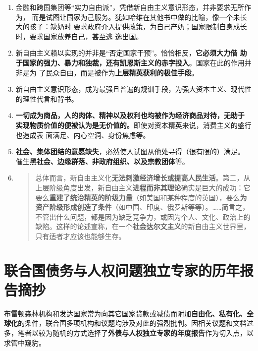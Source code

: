 \begin{enumerate}
\item 金融和跨国集团等“实力自由派”，凭借新自由主义意识形态，并非要求无所作为，
  而是试图让国家为己服务。犹如哈维在其他书中做的比喻，像一个未长大的孩子：缺奶时
  要求政府介入提供政策，为自己产奶；国家限制自身成长时，要求国家放养自己，甚至逃
  逸出国。

\item 新自由主义赖以实现的并非是“否定国家干预”。恰恰相反，\textbf{它必须大力借
    助于国家的强力、暴力和独裁，还有凯恩斯主义的赤字投入}。国家在此的作用并非是为
  了民众自由，而是被作为\textbf{上层精英获利的极佳手段}。

\item 新自由主义意识形态，成为最强且普遍的规训手段，为强大资本主义、现代性的理性代言和背书。

\item \textbf{一切成为商品，人的肉体、精神以及权利也均被作为经济商品对待，无助于
    实现物质价值的便被认为是无价值的。}即使对资本精英来说，消费主义的盛行也造成表
  面满足、内心空洞、身份焦虑等。

\item \textbf{社会、集体团结的意愿缺失}，必然使人试图从他处寻得（很有限的）满足。
  催生\textbf{黑社会、边缘群落、非政府组织、以及宗教团体}等。

\item
  \begin{quotation}总体而言，新自由主义化\textbf{无法刺激经济增长或提高人民生活}。第二，从上层阶级角度出发，新自由主义\textbf{进程而非其理论}确实是巨大的成功：它要么\textbf{重建了统治精英的阶级力量}（如美国和某种程度的英国），要么\textbf{为资产阶级形成创造了条件}（如中国、印度、俄罗斯等等）。……简言之，不管出什么问题，都是因为缺乏竞争力，或因为个人、文化、政治上的缺陷。这样的论述宣称，在一个\textbf{社会达尔文主义}的新自由主义世界里，只有适者才应该也能够生存。
  \end{quotation}

\end{enumerate}


\section{联合国债务与人权问题独立专家的历年报告摘抄}

布雷顿森林机构和发达国家常为向其它国家贷款或减债而附加\textbf{自由化、私有化、全球化}的条件，联合国多项机构和议题均涉及对此的强烈批判。因相关议题和文档过多，笔者以较为随机的方式选择了\textbf{外债与人权独立专家的年度报告}作为切入点，以求管中窥豹。

